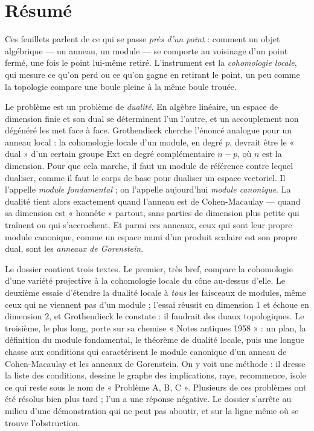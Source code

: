 \documentclass[11pt,a4paper]{article}
\begin{document}
\section*{Résumé}

\begin{resume}
Ces feuillets parlent de ce qui se passe \emph{près d'un point} : comment un
objet algébrique --- un anneau, un module --- se comporte au voisinage d'un
point fermé, une fois le point lui-même retiré. L'instrument est la
\emph{cohomologie locale}, qui mesure ce qu'on perd ou ce qu'on gagne en
retirant le point, un peu comme la topologie compare une boule pleine à la
même boule trouée.

Le problème est un problème de \emph{dualité}. En algèbre linéaire, un espace
de dimension finie et son dual se déterminent l'un l'autre, et un accouplement
non dégénéré les met face à face. Grothendieck cherche l'énoncé analogue pour
un anneau local : la cohomologie locale d'un module, en degré $p$, devrait être
le « dual » d'un certain groupe $\mathrm{Ext}$ en degré complémentaire $n-p$,
où $n$ est la dimension. Pour que cela marche, il faut un module de référence
contre lequel dualiser, comme il faut le corps de base pour dualiser un espace
vectoriel. Il l'appelle \emph{module fondamental} ; on l'appelle aujourd'hui
\emph{module canonique}. La dualité tient alors exactement quand l'anneau est
de Cohen-Macaulay --- quand sa dimension est « honnête » partout, sans parties
de dimension plus petite qui traînent ou qui s'accrochent. Et parmi ces
anneaux, ceux qui sont leur propre module canonique, comme un espace muni d'un
produit scalaire est son propre dual, sont les \emph{anneaux de Gorenstein}.

Le dossier contient trois textes. Le premier, très bref, compare la cohomologie
d'une variété projective à la cohomologie locale du cône au-dessus d'elle. Le
deuxième essaie d'étendre la dualité locale à \emph{tous} les faisceaux de
modules, même ceux qui ne viennent pas d'un module ; l'essai réussit en
dimension $1$ et échoue en dimension $2$, et Grothendieck le constate : il
faudrait des duaux topologiques. Le troisième, le plus long, porte sur sa
chemise « Notes antiques 1958 » : un plan, la définition du module fondamental,
le théorème de dualité locale, puis une longue chasse aux conditions qui
caractérisent le module canonique d'un anneau de Cohen-Macaulay et les anneaux
de Gorenstein. On y voit une méthode : il dresse la liste des conditions,
dessine le graphe des implications, raye, recommence, isole ce qui reste sous
le nom de « Problème A, B, C ». Plusieurs de ces problèmes ont été résolus
bien plus tard ; l'un a une réponse négative. Le dossier s'arrête au milieu
d'une démonstration qui ne peut pas aboutir, et sur la ligne même où se
trouve l'obstruction.


\end{resume}
\end{document}
